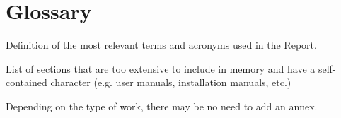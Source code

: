 \documentclass[ENG]{TFUOC}%
\begin{document}


\chapter{Glossary}

Definition of the most relevant terms and acronyms used in the Report.







\newpage
\appendix
List of sections that are too extensive to include in memory and have a self-contained character (e.g. user manuals, installation manuals, etc.)
 
Depending on the type of work, there may be no need to add an annex.
\end{document}
